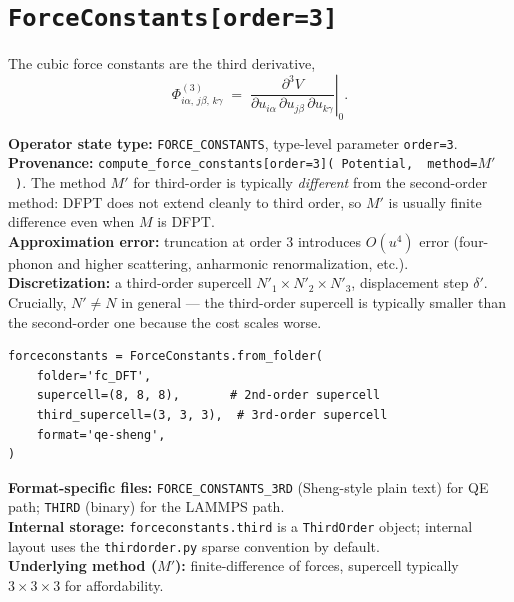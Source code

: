 \documentclass[11pt,a4paper]{article}
\begin{document}
\section{\texttt{ForceConstants[order=3]}}

\begin{abstractbox}
The cubic force constants are the third derivative,
\begin{equation}
  \Phi^{(3)}_{i\alpha,\,j\beta,\,k\gamma} \;=\; \left.\frac{\partial^3 V}{\partial u_{i\alpha}\,\partial u_{j\beta}\,\partial u_{k\gamma}}\right|_{0}.
\end{equation}

\medskip
\textbf{Operator state type:} \texttt{FORCE\_CONSTANTS}, type-level parameter \texttt{order=3}.\\
\textbf{Provenance:} \texttt{compute\_force\_constants[order=3](\,Potential,\, method=$M'$\,)}.
The method $M'$ for third-order is typically \emph{different} from the second-order method:
DFPT does not extend cleanly to third order, so $M'$ is usually finite difference even when $M$
is DFPT.\\
\textbf{Approximation error:} truncation at order 3 introduces $O(u^4)$ error
(four-phonon and higher scattering, anharmonic renormalization, etc.).\\
\textbf{Discretization:} a third-order supercell $N'_1{\times}N'_2{\times}N'_3$,
displacement step $\delta'$. Crucially, $N' \neq N$ in general --- the third-order supercell is
typically smaller than the second-order one because the cost scales worse.
\end{abstractbox}

\begin{kaldobox}
\begin{verbatim}
forceconstants = ForceConstants.from_folder(
    folder='fc_DFT',
    supercell=(8, 8, 8),       # 2nd-order supercell
    third_supercell=(3, 3, 3),  # 3rd-order supercell
    format='qe-sheng',
)
\end{verbatim}
\textbf{Format-specific files:} \texttt{FORCE\_CONSTANTS\_3RD} (Sheng-style plain text) for QE
path; \texttt{THIRD} (binary) for the LAMMPS path.\\
\textbf{Internal storage:} \texttt{forceconstants.third} is a \texttt{ThirdOrder} object;
internal layout uses the \texttt{thirdorder.py} sparse convention by default.\\
\textbf{Underlying method ($M'$):} finite-difference of forces, supercell typically
$3{\times}3{\times}3$ for affordability.
\end{kaldobox}
\end{document}
